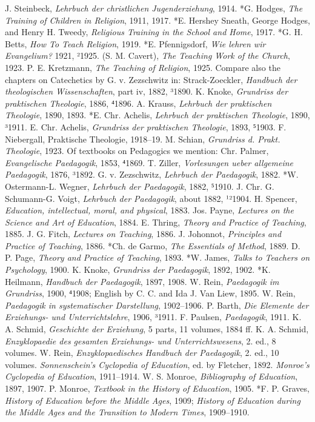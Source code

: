 J. Steinbeck, \emph{Lehrbuch der christlichen Jugenderziehung}, 1914. *G. Hodges, \emph{The Training of Children in Religion}, 1911, 1917. *E. Hershey Sneath, George Hodges, and Henry H. Tweedy, \emph{Religious Training in the School and Home}, 1917. *G. H. Betts, \emph{How To Teach Religion}, 1919. *E. Pfennigsdorf, \emph{Wie lehren wir Evangelium?} 1921, ²1925. (S. M. Cavert), \emph{The Teaching Work of the Church}, 1923. P. E. Kretzmann, \emph{The Teaching of Religion}, 1925. Compare also the chapters on Catechetics by G. v. Zezschwitz in: Strack-Zoeckler, \emph{Handbuch der theologischen Wissenschaften}, part iv, 1882, ³1890. K. Knoke, \emph{Grundriss der praktischen Theologie}, 1886, ⁴1896. A. Krauss, \emph{Lehrbuch der praktischen Theologie}, 1890, 1893. *E. Chr. Achelis, \emph{Lehrbuch der praktischen Theologie}, 1890, ³1911. E. Chr. Achelis, \emph{Grundriss der praktischen Theologie}, 1893, ⁵1903. F. Niebergall, Praktische Theologie, 1918–19. M. Schian, \emph{Grundriss d. Prakt. Theologie}, 1923. Of textbooks on Pedagogics we mention: Chr. Palmer, \emph{Evangelische Paedagogik}, 1853, ⁴1869. T. Ziller, \emph{Vorlesungen ueber allgemeine Paedagogik}, 1876, ³1892. G. v. Zezschwitz, \emph{Lehrbuch der Paedagogik}, 1882. *W. Ostermann-L. Wegner, \emph{Lehrbuch der Paedagogik}, 1882, ⁵1910. J. Chr. G. Schumann-G. Voigt, \emph{Lehrbuch der Paedagogik}, about 1882, ¹²1904. H. Spencer, \emph{Education, intellectual, moral, and physical}, 1883. Jos. Payne, \emph{Lectures on the Science and Art of Education}, 1884. E. Thring, \emph{Theory and Practice of Teaching}, 1885. J. G. Fitch, \emph{Lectures on Teaching}, 1886. J. Johonnot, \emph{Principles and Practice of Teaching}, 1886. *Ch. de Garmo, \emph{The Essentials of Method}, 1889. D. P. Page, \emph{Theory and Practice of Teaching}, 1893. *W. James, \emph{Talks to Teachers on Psychology}, 1900. K. Knoke, \emph{Grundriss der Paedagogik}, 1892, 1902. *K. Heilmann, \emph{Handbuch der Paedagogik}, 1897, 1908. W. Rein, \emph{Paedagogik im Grundriss}, 1900, ⁴1908; English by C. C. and Ida J. Van Liew, 1895. W. Rein, \emph{Paedagogik in systematischer Darstellung}, 1902–1906. P. Barth, \emph{Die Elemente der Erziehungs- und Unterrichtslehre}, 1906, ³1911. F. Paulsen, \emph{Paedagogik}, 1911. K. A. Schmid, \emph{Geschichte der Erziehung}, 5 parts, 11 volumes, 1884 ff. K. A. Schmid, \emph{Enzyklopaedie des gesamten Erziehungs- und Unterrichtswesens}, 2. ed., 8 volumes. W. Rein, \emph{Enzyklopaedisches Handbuch der Paedagogik}, 2. ed., 10 volumes. \emph{Sonnenschein’s Cyclopedia of Education}, ed. by Fletcher, 1892. \emph{Monroe’s Cyclopedia of Education}, 1911–1914. W. S. Monroe, \emph{Bibliography of Education}, 1897, 1907. P. Monroe, \emph{Textbook in the History of Education}, 1905. *F. P. Graves, \emph{History of Education before the Middle Ages}, 1909; \emph{History of Education during the Middle Ages and the Transition to Modern Times}, 1909–1910.

